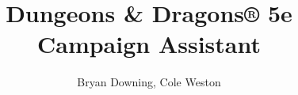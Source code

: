\documentclass[10pt,conference,onecolumn,compsoc]{IEEEtran}
\begin{document}
%
\title{Dungeons \& Dragons® 5e Campaign Assistant}
%
%
%
%

\author{Bryan Downing, Cole Weston\\ %
}

% 
%
\end{document}
